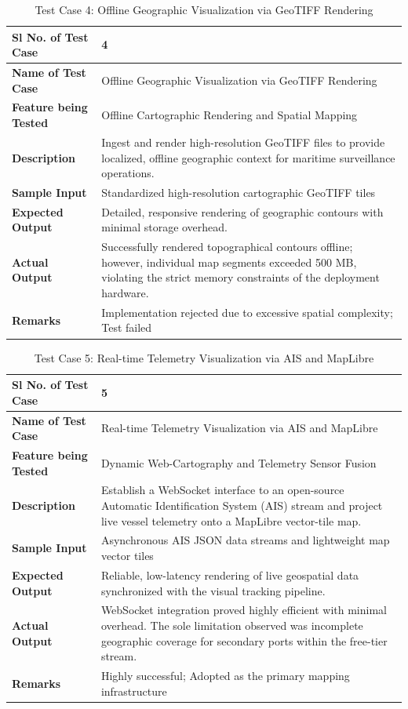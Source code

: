 \begin{table}[H]
\centering
\caption{Test Case 4: Offline Geographic Visualization via GeoTIFF Rendering}
\label{tab:testcase4}
\begin{tabular}{|p{}|p{}|}
\hline
\textbf{Sl No. of Test Case} & 4 \\
\hline
\textbf{Name of Test Case} & Offline Geographic Visualization via GeoTIFF Rendering \\
\hline
\textbf{Feature being Tested} & Offline Cartographic Rendering and Spatial Mapping \\
\hline
\textbf{Description} & Ingest and render high-resolution GeoTIFF files to provide localized, offline geographic context for maritime surveillance operations. \\
\hline
\textbf{Sample Input} & Standardized high-resolution cartographic GeoTIFF tiles \\
\hline
\textbf{Expected Output} & Detailed, responsive rendering of geographic contours with minimal storage overhead. \\
\hline
\textbf{Actual Output} & Successfully rendered topographical contours offline; however, individual map segments exceeded 500 MB, violating the strict memory constraints of the deployment hardware. \\
\hline
\textbf{Remarks} & Implementation rejected due to excessive spatial complexity; Test failed \\
\hline
\end{tabular}
\end{table}

\begin{table}[H]
\centering
\caption{Test Case 5: Real-time Telemetry Visualization via AIS and MapLibre}
\label{tab:testcase5}
\begin{tabular}{|p{}|p{}|}
\hline
\textbf{Sl No. of Test Case} & 5 \\
\hline
\textbf{Name of Test Case} & Real-time Telemetry Visualization via AIS and MapLibre \\
\hline
\textbf{Feature being Tested} & Dynamic Web-Cartography and Telemetry Sensor Fusion \\
\hline
\textbf{Description} & Establish a WebSocket interface to an open-source Automatic Identification System (AIS) stream and project live vessel telemetry onto a MapLibre vector-tile map. \\
\hline
\textbf{Sample Input} & Asynchronous AIS JSON data streams and lightweight map vector tiles \\
\hline
\textbf{Expected Output} & Reliable, low-latency rendering of live geospatial data synchronized with the visual tracking pipeline. \\
\hline
\textbf{Actual Output} & WebSocket integration proved highly efficient with minimal overhead. The sole limitation observed was incomplete geographic coverage for secondary ports within the free-tier stream. \\
\hline
\textbf{Remarks} & Highly successful; Adopted as the primary mapping infrastructure \\
\hline
\end{tabular}
\end{table}

